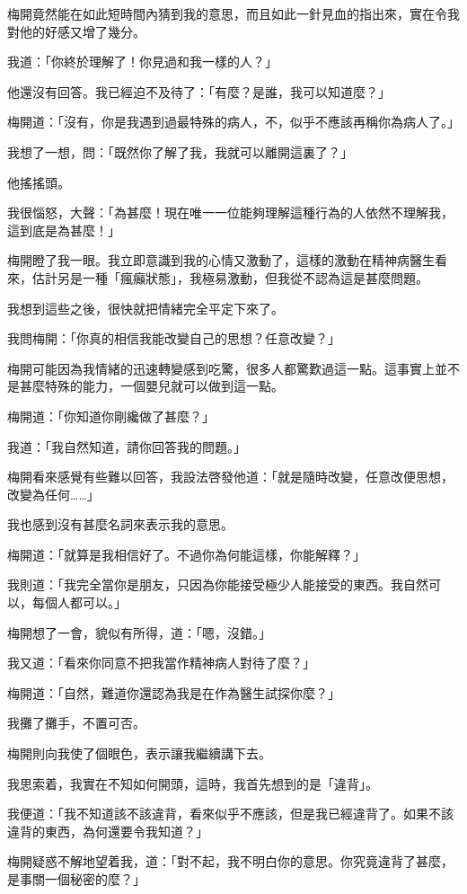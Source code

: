 梅開竟然能在如此短時間內猜到我的意思，而且如此一針見血的指出來，實在令我對他的好感又增了幾分。

我道：「你終於理解了！你見過和我一樣的人？」

他還沒有回答。我已經迫不及待了：「有麼？是誰，我可以知道麼？」

梅開道：「沒有，你是我遇到過最特殊的病人，不，似乎不應該再稱你為病人了。」

我想了一想，問：「既然你了解了我，我就可以離開這裏了？」

他搖搖頭。

我很惱怒，大聲：「為甚麼！現在唯一一位能夠理解這種行為的人依然不理解我，這到底是為甚麼！」

梅開瞪了我一眼。我立即意識到我的心情又激動了，這樣的激動在精神病醫生看來，估計另是一種「瘋癲狀態」，我極易激動，但我從不認為這是甚麼問題。

我想到這些之後，很快就把情緒完全平定下來了。

我問梅開：「你真的相信我能改變自己的思想？任意改變？」

梅開可能因為我情緒的迅速轉變感到吃驚，很多人都驚歎過這一點。這事實上並不是甚麼特殊的能力，一個嬰兒就可以做到這一點。

梅開道：「你知道你剛纔做了甚麼？」

我道：「我自然知道，請你回答我的問題。」

梅開看來感覺有些難以回答，我設法啓發他道：「就是隨時改變，任意改便思想，改變為任何……」

我也感到沒有甚麼名詞來表示我的意思。

梅開道：「就算是我相信好了。不過你為何能這樣，你能解釋？」

我則道：「我完全當你是朋友，只因為你能接受極少人能接受的東西。我自然可以，每個人都可以。」

梅開想了一會，貌似有所得，道：「嗯，沒錯。」

我又道：「看來你同意不把我當作精神病人對待了麼？」

梅開道：「自然，難道你還認為我是在作為醫生試探你麼？」

我攤了攤手，不置可否。

梅開則向我使了個眼色，表示讓我繼續講下去。

我思索着，我實在不知如何開頭，這時，我首先想到的是「違背」。

我便道：「我不知道該不該違背，看來似乎不應該，但是我已經違背了。如果不該違背的東西，為何還要令我知道？」

梅開疑惑不解地望着我，道：「對不起，我不明白你的意思。你究竟違背了甚麼，是事關一個秘密的麼？」

